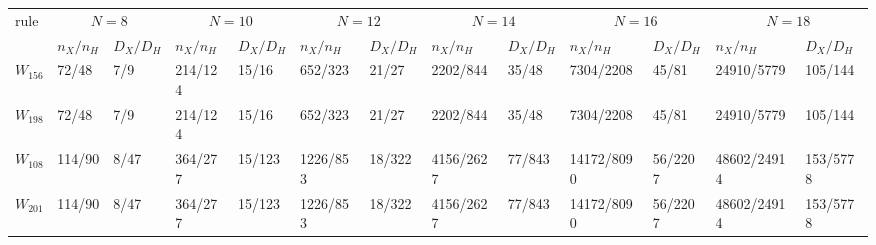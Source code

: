 \begin{tabular}{lllllllllllll}
\toprule
rule & \multicolumn{2}{c}{$N=8$} & \multicolumn{2}{c}{$N=10$} & \multicolumn{2}{c}{$N=12$} & \multicolumn{2}{c}{$N=14$} & \multicolumn{2}{c}{$N=16$} & \multicolumn{2}{c}{$N=18$} \\
 & $n_X/n_H$ & $D_X/D_H$ & $n_X/n_H$ & $D_X/D_H$ & $n_X/n_H$ & $D_X/D_H$ & $n_X/n_H$ & $D_X/D_H$ & $n_X/n_H$ & $D_X/D_H$ & $n_X/n_H$ & $D_X/D_H$ \\
\midrule
$W_{156}$ & 72/48 & 7/9 & 214/124 & 15/16 & 652/323 & 21/27 & 2202/844 & 35/48 & 7304/2208 & 45/81 & 24910/5779 & 105/144 \\
$W_{198}$ & 72/48 & 7/9 & 214/124 & 15/16 & 652/323 & 21/27 & 2202/844 & 35/48 & 7304/2208 & 45/81 & 24910/5779 & 105/144 \\
$W_{108}$ & 114/90 & 8/47 & 364/277 & 15/123 & 1226/853 & 18/322 & 4156/2627 & 77/843 & 14172/8090 & 56/2207 & 48602/24914 & 153/5778 \\
$W_{201}$ & 114/90 & 8/47 & 364/277 & 15/123 & 1226/853 & 18/322 & 4156/2627 & 77/843 & 14172/8090 & 56/2207 & 48602/24914 & 153/5778 \\
\bottomrule
\end{tabular}

